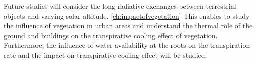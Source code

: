 Future studies will consider the long-radiative exchanges between terrestrial objects and varying solar altitude. \cref{ch:impactofvegetation}  This enables to study the influence of vegetation in urban areas and understand the thermal role of the ground and buildings on the transpirative cooling effect of vegetation. Furthermore, the influence of water availability at the roots on the transpiration rate and the impact on transpirative cooling effect will be studied.
